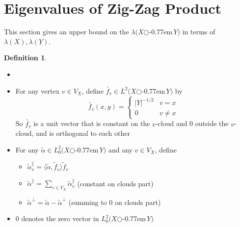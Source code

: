 \documentclass{book}
\newcommand{\zigzag}{$\bigcirc$\kern-0.77em\raisebox{-.16ex}{\small Z}$\,$}
\newcommand{\inner}[1]{\langle #1 \rangle}
\newcommand{\abs}[1]{\lvert #1 \rvert }
\theoremstyle{definition}
\newtheorem{definition}[lemma]{Definition}
\theoremstyle{remarkstyle}
\begin{document}
\section{Eigenvalues of Zig-Zag Product}
This section gives an upper bound on the $\lambda(X$\zigzag$Y)$ in terms of $\lambda(X),\lambda(Y)$. \newline

\begin{definition}
    \begin{itemize}
        \item[]
        \item For any vertex $v\in V_X$, define $\tilde{f_v}\in L^{2}(X$\zigzag$Y)$ by 
        $$
        \tilde{f_v}(x,y)= \left\{ 
        \begin{array}{ll}
             \abs{Y}^{-1/2} & v=x  \\
             0 & v\neq x 
        \end{array}
        \right.
        $$
        So $\tilde{f_v}$ is a unit vector that is constant on the $v$-cloud and 0 outside the $v$-cloud, and is orthogonal to each other 
        \item For any $\tilde{\alpha}\in L^{2}_{0}(X$\zigzag$Y)$ and any $v\in V_X$, define 
        \begin{itemize}
            \item $\tilde{\alpha}_{v}^{\parallel} = \inner{\tilde{\alpha},\tilde{f}_{v}}\tilde{f}_v $ 
            \item $\tilde{\alpha}^{\parallel}=\sum_{v\in V_X}\tilde{\alpha}^{\parallel}_{v} $ (constant on clouds part)
            \item $\tilde{\alpha}^{\perp} = \tilde{\alpha} - \tilde{\alpha}^{\perp} $ (summing to 0 on clouds part)
        \end{itemize}
        \item 0 denotes the zero vector in $L^{2}_{0}(X$\zigzag$Y)$ 
    \end{itemize}
\end{definition}
\end{document}
